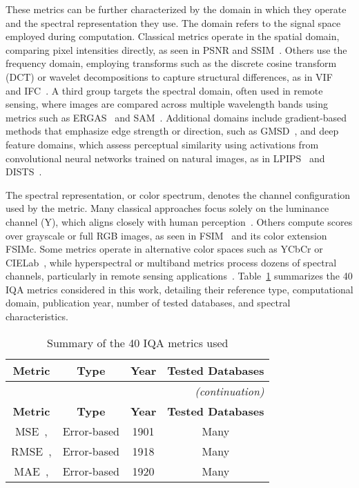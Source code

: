 These metrics can be further characterized by the domain in which they operate and the spectral representation they use. The domain refers to the signal space employed during computation. Classical metrics operate in the spatial domain, comparing pixel intensities directly, as seen in PSNR and SSIM~\cite{Wang2004SSIM}. Others use the frequency domain, employing transforms such as the discrete cosine transform (DCT) or wavelet decompositions to capture structural differences, as in VIF~\cite{sheikh_vif_2006} and IFC~\cite{sheikh2005ifc}. A third group targets the spectral domain, often used in remote sensing, where images are compared across multiple wavelength bands using metrics such as ERGAS~\cite{Ranchin2000ERGAS} and SAM~\cite{Kruse1993SAM}. Additional domains include gradient-based methods that emphasize edge strength or direction, such as GMSD~\cite{Xue2014GMSD}, and deep feature domains, which assess perceptual similarity using activations from convolutional neural networks trained on natural images, as in LPIPS~\cite{zhang2018lpips} and DISTS~\cite{ding2020dists}.

The spectral representation, or color spectrum, denotes the channel configuration used by the metric. Many classical approaches focus solely on the luminance channel (Y), which aligns closely with human perception~\cite{sheikh_vif_2006, chandler2007vsnr}. Others compute scores over grayscale or full RGB images, as seen in FSIM~\cite{zhang2011fsim} and its color extension FSIMc. Some metrics operate in alternative color spaces such as YCbCr or CIELab~\cite{Wang2002PQM}, while hyperspectral or multiband metrics process dozens of spectral channels, particularly in remote sensing applications~\cite{Zhou1998SCC,Alparone2008QNR}. Table~\ref{tab:fr_iqa_metrics} summarizes the 40 IQA metrics considered in this work, detailing their reference type, computational domain, publication year, number of tested databases, and spectral characteristics.


\begin{longtable}{c c c c}
    \caption{Summary of the 40 IQA metrics used}\label{tab:fr_iqa_metrics}\\
    \hline %
    \textbf{Metric} & \textbf{Type} & \textbf{Year} & \textbf{Tested Databases} \\
    \hline %
    \endfirsthead %
    \multicolumn{4}{r}{\small\itshape(continuation)}\\ %
    \hline %
    \textbf{Metric} & \textbf{Type} & \textbf{Year} & \textbf{Tested Databases} \\
    \hline %
    \endhead %
    \hline %
    \endfoot %

    MSE~\cite{gonzalez2002digital}, & Error-based & 1901 & Many \\
    RMSE~\cite{gonzalez2002digital}, & Error-based & 1918 & Many \\ 
    MAE~\cite{gonzalez2002digital}, & Error-based & 1920 & Many \\




\end{longtable}


